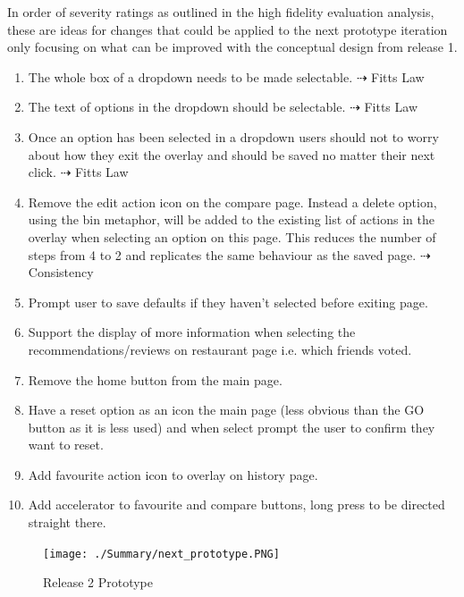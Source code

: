 \documentclass[a4 paper, 12pt]{article}
\begin{document}
In order of severity ratings as outlined in the high fidelity evaluation analysis, these are ideas for changes that could be applied to the next prototype iteration only focusing on what can be improved with the conceptual design from release 1. 
\smallskip
    \begin{enumerate}[noitemsep,topsep=0pt]
        \item The whole box of a dropdown needs to be made selectable. $\dashrightarrow$ Fitts Law
        \item The text of options in the dropdown should be selectable. $\dashrightarrow$ Fitts Law
        \item Once an option has been selected in a dropdown users should not to worry about how they exit the overlay and should be saved no matter their next click. $\dashrightarrow$ Fitts Law
        \item Remove the edit action icon on the compare page. Instead a delete option, using the bin metaphor, will be added to the existing list of actions in the overlay when selecting an option on this page. This reduces the number of steps from 4 to 2 and replicates the same behaviour as the saved page. $\dashrightarrow$ Consistency
        \item Prompt user to save defaults if they haven't selected before exiting page.
        \item Support the display of more information when selecting the recommendations/reviews on restaurant page i.e. which friends voted.
        \item Remove the home button from the main page.
        \item Have a reset option as an icon the main page (less obvious than the GO button as it is less used) and when select prompt the user to confirm they want to reset.
        \item Add favourite action icon to overlay on history page.
        \item Add accelerator to favourite and compare buttons, long press to be directed straight there.        
    \end{enumerate}
    
    \begin{figure} [H]
        \centering
        \texttt{[image: ./Summary/next\_prototype.PNG]} 
        \caption{Release 2 Prototype}
    \end{figure}  

\pagebreak
\end{document}
